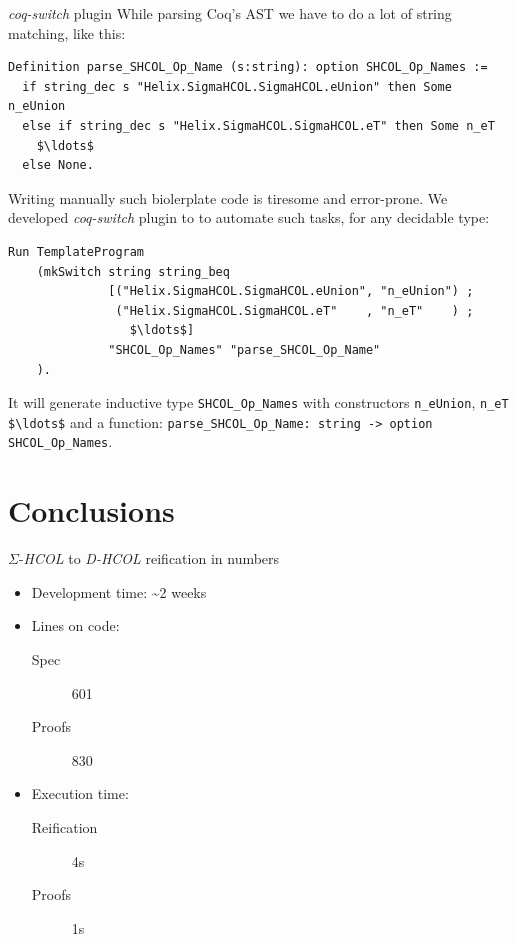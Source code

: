 \documentclass[aspectratio=169]{beamer}
\newcommand{\SHCOL}{\texorpdfstring{$\Sigma$-\emph{HCOL}}{Sigma-HCOL}}
\newcommand{\DHCOL}{\emph{D-HCOL}}
\begin{document}
\begin{frame}[fragile]{\emph{coq-switch} plugin}
  While parsing Coq's AST we have to do a lot of string matching, like
  this:
  \begin{lstlisting}[language=Coq, mathescape=true, frame=single,
    basicstyle=\scriptsize]
Definition parse_SHCOL_Op_Name (s:string): option SHCOL_Op_Names :=
  if string_dec s "Helix.SigmaHCOL.SigmaHCOL.eUnion" then Some n_eUnion
  else if string_dec s "Helix.SigmaHCOL.SigmaHCOL.eT" then Some n_eT
    $\ldots$
  else None.    
\end{lstlisting}

Writing manually such biolerplate code is tiresome and error-prone. We
developed \emph{coq-switch} plugin to to automate such tasks, for any
decidable type:

\begin{lstlisting}[language=Coq, mathescape=true, frame=single, basicstyle=\scriptsize]
  Run TemplateProgram
    (mkSwitch string string_beq
              [("Helix.SigmaHCOL.SigmaHCOL.eUnion", "n_eUnion") ;
               ("Helix.SigmaHCOL.SigmaHCOL.eT"    , "n_eT"    ) ;
                 $\ldots$]
              "SHCOL_Op_Names" "parse_SHCOL_Op_Name"
    ).
\end{lstlisting}

It will generate inductive type \lstinline[language=Coq]{SHCOL_Op_Names}
with constructors \lstinline[language=Coq]{n_eUnion}, \lstinline[language=Coq]{n_eT $\ldots$} and a
function: \lstinline[language=Coq]{parse_SHCOL_Op_Name: string -> option SHCOL_Op_Names}.

\end{frame}

\section{Conclusions}

\begin{frame}{{\SHCOL} to {\DHCOL} reification in numbers}
  \begin{itemize}
  \item Development time: \textasciitilde 2 weeks
  \item Lines on code:
    \begin{description}
    \item[Spec] 601
    \item[Proofs] 830
    \end{description}
  \item Execution time:
    \begin{description}
    \item[Reification] 4s
    \item[Proofs] 1s
    \end{description}
\end{itemize}
  

\end{frame}
    
\end{document}
